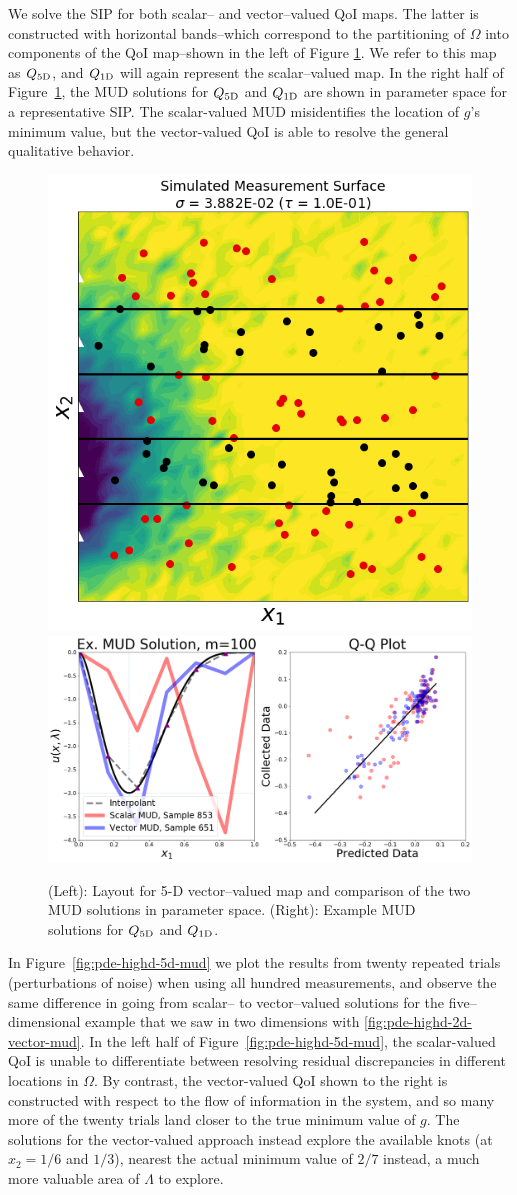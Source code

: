 We solve the SIP for both scalar-- and vector--valued QoI maps.
The latter is constructed with horizontal bands\---which correspond to the partitioning of $\Omega$ into components of the QoI map\---shown in the left of Figure \ref{fig:pde-highd-5d-example}.
We refer to this map as $Q_\text{5D}$, and $Q_\text{1D}$ will again represent the scalar--valued map.
In the right half of Figure~\ref{fig:pde-highd-5d-example}, the MUD solutions for $Q_\text{5D}$ and $Q_\text{1D}$ are shown in parameter space for a representative SIP.
The scalar-valued MUD misidentifies the location of $g$'s minimum value, but the vector-valued QoI is able to resolve the general qualitative behavior.

\begin{figure}
\centering
  \includegraphics[width=0.45\linewidth]{figures/pde-highd/pde-highd_sensors_D5}
  \includegraphics[width=0.45\linewidth]{figures/pde-highd/pde-highd_comp_exmud_D5_m100}
\caption{
(Left): Layout for 5-D vector--valued map and comparison of the two MUD solutions in parameter space.
(Right): Example MUD solutions for $Q_\text{5D}$ and $Q_\text{1D}$.
}
\label{fig:pde-highd-5d-example}
\end{figure}

In Figure~\ref{fig:pde-highd-5d-mud} we plot the results from twenty repeated trials (perturbations of noise) when using all hundred measurements, and observe the same difference in going from scalar-- to vector--valued solutions for the five--dimensional example that we saw in two dimensions with \ref{fig:pde-highd-2d-vector-mud}.
In the left half of Figure~\ref{fig:pde-highd-5d-mud}, the scalar-valued QoI is unable to differentiate between resolving residual discrepancies in different locations in $\Omega$.
By contrast, the vector-valued QoI shown to the right is constructed with respect to the flow of information in the system, and so many more of the twenty trials land closer to the true minimum value of $g$.
The solutions for the vector-valued approach instead explore the available knots (at $x_2=1/6$ and $1/3$), nearest the actual minimum value of $2/7$ instead, a much more valuable area of $\Lambda$ to explore.

